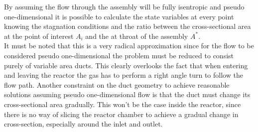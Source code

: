 By assuming the flow through the assembly will be fully isentropic and pseudo one-dimensional it is possible to calculate the state variables at every point knowing the stagnation conditions and the ratio between the cross-sectional area at the point of interest $A_i$ and the at throat of the assembly $A^*$.\\
It must be noted that this is a very radical approximation since for the flow to be  considered pseudo one-dimensional the problem must be reduced to consist purely of variable area ducts.
This clearly overlooks the fact that when entering and leaving the reactor the gas has to perform a right angle turn to follow the flow path.
Another constraint on the duct geometry to achieve reasonable solutions assuming pseudo one-dimensional flow is that the duct must change its cross-sectional area gradually.
\cite{anderson2021modern}
This won't be the case inside the reactor, since there is no way of slicing the reactor chamber to achieve a gradual change in cross-section, especially around the inlet and outlet.

\cite{SALAS1986193}
\cite{EMMONS1958}
